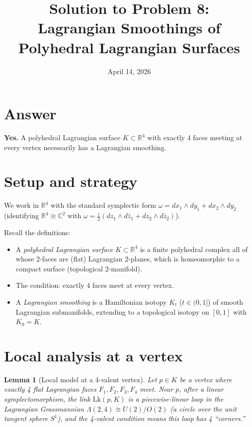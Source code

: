 \documentclass[12pt]{article}
\title{Solution to Problem 8:\\Lagrangian Smoothings of Polyhedral Lagrangian Surfaces}
\author{}
\date{April 14, 2026}
\newtheorem{lemma}[theorem]{Lemma}
\newcommand{\bR}{\mathbb{R}}
\begin{document}
\maketitle

\section*{Answer}

\textbf{Yes.} A polyhedral Lagrangian surface $K \subset \bR^4$ with exactly 4 faces meeting at every vertex necessarily has a Lagrangian smoothing.

\section*{Setup and strategy}

We work in $\bR^4$ with the standard symplectic form $\omega = dx_1\wedge dy_1 + dx_2\wedge dy_2$ (identifying $\bR^4 \cong \mathbb{C}^2$ with $\omega = \frac{i}{2}(dz_1\wedge d\bar{z}_1 + dz_2\wedge d\bar{z}_2)$).

Recall the definitions:
\begin{itemize}
  \item A \emph{polyhedral Lagrangian surface} $K\subset\bR^4$ is a finite polyhedral complex all of whose 2-faces are (flat) Lagrangian 2-planes, which is homeomorphic to a compact surface (topological 2-manifold).
  \item The condition: exactly 4 faces meet at every vertex.
  \item A \emph{Lagrangian smoothing} is a Hamiltonian isotopy $K_t$ ($t\in(0,1]$) of smooth Lagrangian submanifolds, extending to a topological isotopy on $[0,1]$ with $K_0 = K$.
\end{itemize}

\section*{Local analysis at a vertex}

\begin{lemma}[Local model at a 4-valent vertex]
  \label{lem:local}
  Let $p \in K$ be a vertex where exactly 4 flat Lagrangian faces $F_1, F_2, F_3, F_4$ meet.  Near $p$, after a linear symplectomorphism, the link $\mathrm{Lk}(p, K)$ is a piecewise-linear loop in the Lagrangian Grassmannian $\Lambda(2,4) \cong U(2)/O(2)$ (a circle over the unit tangent sphere $S^1$), and the 4-valent condition means this loop has 4 ``corners.''
\end{lemma}
\end{document}
